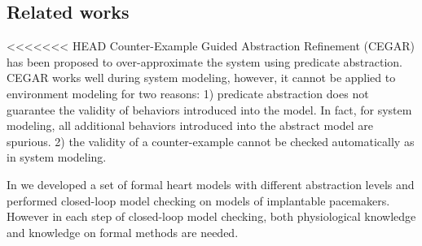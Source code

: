 \subsection{Related works}
<<<<<<< HEAD
Counter-Example Guided Abstraction Refinement (CEGAR) \cite{CEGAR} has been proposed to over-approximate the system using predicate abstraction. 
CEGAR works well during system modeling, however, it cannot be applied to environment modeling for two reasons: 1) predicate abstraction does not guarantee the validity of behaviors introduced into the model. In fact, for system modeling, all additional behaviors introduced into the abstract model are spurious. 2) the validity of a counter-example cannot be checked automatically as in system modeling. 


In \cite{sttt13} we developed a set of formal heart models with different abstraction levels and performed closed-loop model checking on models of implantable pacemakers. 
However in each step of closed-loop model checking, both physiological knowledge and knowledge on formal methods are needed.

